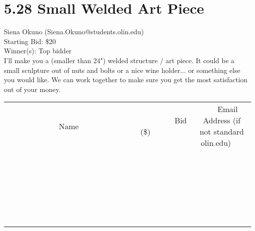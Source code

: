 \documentclass[11pt]{article}
\begin{document}
\section*{5.28 Small Welded Art Piece}
Siena Okuno (Siena.Okuno@students.olin.edu) \\
Starting Bid: \$20 \\
Winner(s): 
Top bidder \\
I'll make you a (smaller than 24") welded structure / art piece. It could be a small sculpture out of nuts and bolts or a nice wine holder... or something else you would like. We can work together to make sure you get the most satisfaction out of your money. \\[6ex]
\begin{tabular}{c c c}
~~~~~~~~~~~~~Name~~~~~~~~~~~~~ & ~~~~~~~~~Bid (\$)~~~~~~~~~ & ~~~Email Address (if not standard olin.edu)~~~ \\
 & & \\
\hline
 & & \\
\hline
 & & \\
\hline
 & & \\
\hline
 & & \\
\hline
 & & \\
\hline
 & & \\
\hline
 & & \\
\hline
 & & \\
\hline
 & & \\
\hline
 & & \\
\hline
 & & \\
\hline
 & & \\
\hline
 & & \\
\hline
 & & \\
\hline
 & & \\
\hline
 & & \\
\hline
 & & \\
\hline
 & & \\
\hline
 & & \\
\hline
 & & \\
\hline
 & & \\
\hline
 & & \\
\hline
 & & \\
\hline
 & & \\
\hline
 & & \\
\hline
\end{tabular}
\clearpage
\end{document}
